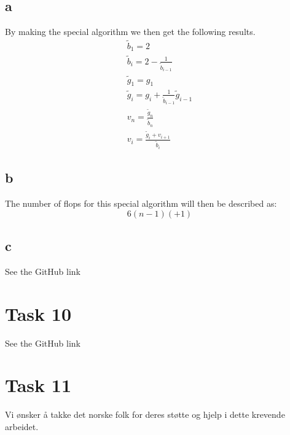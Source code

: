\documentclass[english,notitlepage]{revtex4-1}  %
\begin{document}
    \subsection*{a}
        \label{sec:9a}
        By making the special algorithm we then get the following results. 
        \begin{align*}
                \tilde{b}_1 
            =   2\\
                \tilde{b}_i
            =   2 - \frac{1}{\tilde{b}_{i-1}}\\
                \tilde{g}_1 
            =   g_1\\
                \tilde{g}_i 
            =   g_i + \frac{1}{\tilde{b}_{i-1}}\tilde{g}_{i-1}\\
                v_n 
            =   \frac{\tilde{g}_n}{\tilde{b}_n}\\
                v_i 
            =   \frac{\tilde{g}_i+v_{i+1}}{\tilde{b}_i}
        \end{align*}
    \subsection*{b}
        \label{sec:9b}
        The number of flops for this special algorithm will then be described as: $$6(n-1)(+1)$$
    \subsection*{c}
        \label{sec:9c}
        See the GitHub link


\section*{Task 10}
See the GitHub link


\section*{Task 11}
        



\begin{acknowledgements}
Vi ønsker å takke det norske folk for deres støtte og hjelp i dette krevende arbeidet. 
\end{acknowledgements}

   
\end{document}
